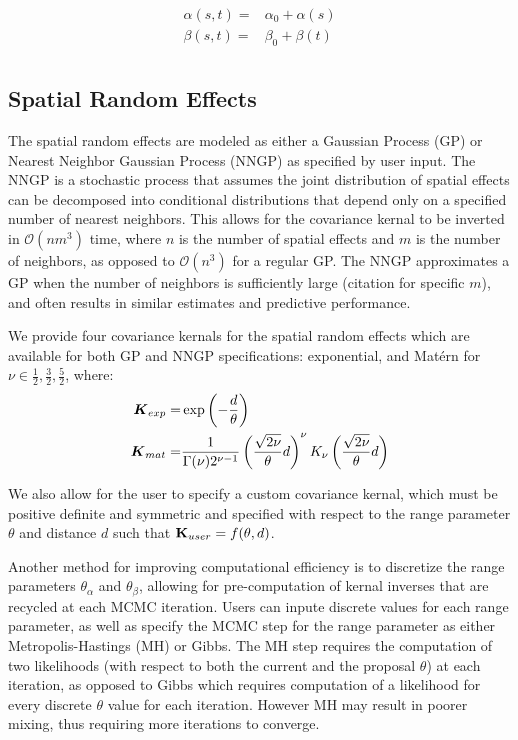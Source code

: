 \begin{align*}
    \alpha(s, t) =& \alpha_0 + \alpha(s)\\
    \beta(s, t) =& \beta_0 + \beta(t) \\
\end{align*} 



\subsection*{Spatial Random Effects}

The spatial random effects are modeled as either a Gaussian Process (GP) or Nearest Neighbor Gaussian Process (NNGP) as specified by user input. 
The NNGP is a stochastic process that assumes the joint distribution of spatial effects can be decomposed into conditional distributions that depend only on a specified number of nearest neighbors. 
This allows for the covariance kernal to be inverted in $\mathcal{O}(n m^3)$ time, where $n$ is the number of spatial effects and $m$ is the number of neighbors, as opposed to $\mathcal{O}(n^3)$ for a regular GP.
The NNGP approximates a GP when the number of neighbors is sufficiently large (citation for specific $m$), and often results in similar estimates and predictive performance. 

We provide four covariance kernals for the spatial random effects which are available for both GP and NNGP specifications: exponential, and Mat\'{e}rn for $\nu \in {\frac{1}{2}, \frac{3}{2}, \frac{5}{2}}$, where:
\begin{align*}
    \boldsymbol{K}_{exp} =& \exp \left( - \frac{d}{\theta} \right) \\
    \boldsymbol{K}_{mat} =& \frac{1}{\Gamma(\nu) 2^{\nu - 1}} \left( \frac{\sqrt{2 \nu}}{\theta} d \right)^{\nu} K_{\nu} \left( \frac{\sqrt{2 \nu}}{\theta} d \right) \\
\end{align*} 

We also allow for the user to specify a custom covariance kernal, which must be positive definite and symmetric and specified with respect to the range parameter $\theta$ and distance $d$ such that $\mathbf{K}_{user} = f(\theta, d)$. 

Another method for improving computational efficiency is to discretize the range parameters $\theta_{\alpha}$ and $\theta_{\beta}$, allowing for pre-computation of kernal inverses that are recycled at each MCMC iteration.
Users can inpute discrete values for each range parameter, as well as specify the MCMC step for the range parameter as either Metropolis-Hastings (MH) or Gibbs. 
The MH step requires the computation of two likelihoods (with respect to both the current and the proposal $\theta$) at each iteration, as opposed to Gibbs which requires computation of a likelihood for every discrete $\theta$ value for each iteration. 
However MH may result in poorer mixing, thus requiring more iterations to converge.

